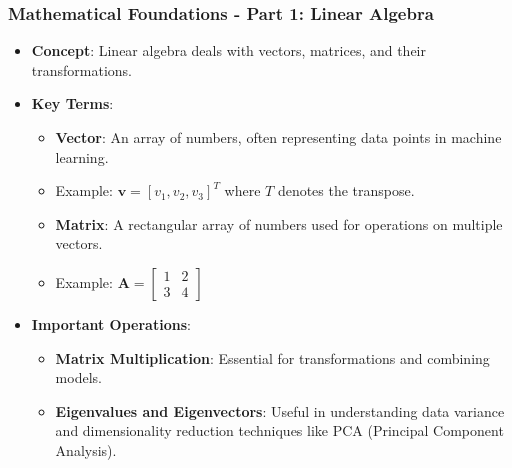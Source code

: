\documentclass[aspectratio=169]{beamer}
\begin{document}
\begin{frame}[fragile]
    \frametitle{Mathematical Foundations - Part 1: Linear Algebra}
    \begin{itemize}
        \item \textbf{Concept}: Linear algebra deals with vectors, matrices, and their transformations.
        \item \textbf{Key Terms}:
        \begin{itemize}
            \item \textbf{Vector}: An array of numbers, often representing data points in machine learning.
            \item Example: $\mathbf{v} = [v_1, v_2, v_3]^T$ where $T$ denotes the transpose.
            
            \item \textbf{Matrix}: A rectangular array of numbers used for operations on multiple vectors.
            \item Example: $\mathbf{A} = \begin{bmatrix} 1 & 2 \\ 3 & 4 \end{bmatrix}$
        \end{itemize}
        \item \textbf{Important Operations}:
        \begin{itemize}
            \item \textbf{Matrix Multiplication}: Essential for transformations and combining models.
            \item \textbf{Eigenvalues and Eigenvectors}: Useful in understanding data variance and dimensionality reduction techniques like PCA (Principal Component Analysis).
        \end{itemize}
    \end{itemize}
\end{frame}
\end{document}
